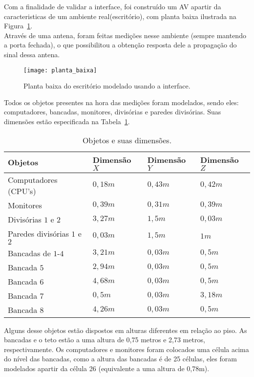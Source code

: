 Com a finalidade de validar a interface, foi construído um AV apartir da caracteristicas de um ambiente real(escritório), com planta baixa ilustrada na Figura~\ref{fg:planta_baixa}.\\

 Através de uma antena, foram feitas medições nesse ambiente (sempre mantendo a porta fechada), o que possibilitou a obtenção resposta dele a propagação do sinal dessa antena.\\

\begin{figure}[!htp]
	\centering
	\texttt{[image: planta\_baixa]}
	\caption{Planta baixa do escritório modelado usando a interface.}
	\label{fg:planta_baixa}
\end{figure}

Todos os objetos presentes na hora das medições foram modelados, sendo eles: computadores, bancadas, monitores, divisórias e paredes divisórias. Suas dimensões estão especificada na Tabela~\ref{tb:objetos}.

\begin{table}
\centering
	\begin{tabular}{|l|l|l|l|}
	\hline
	\textbf{Objetos} & \textbf{Dimensão $X$} & \textbf{Dimensão} $Y$ & \textbf{Dimensão $Z$}\\ \hline
	Computadores (CPU's) & $0,18m$ & $0,43m$ & $0,42m$ \\ \hline
	Monitores & $0,39m$ & $0,31m$ & $0,39m$ \\ \hline
	Divisórias $1$ e $2$ & $3,27m$ & $1,5m$ & $0,03m$ \\ \hline
	Paredes divisórias $1$ e $2$ & $0,03m$ & $1,5m$ & $1m$ \\ \hline
	Bancadas de $1$-$4$ & $3,21m$ & $0,03m$ & $0,5m$ \\ \hline
	Bancada $5$ & $2,94m$ & $0,03m$ & $0,5m$ \\ \hline
	Bancada $6$ & $4,68m$ & $0,03m$ & $0,5m$ \\ \hline
	Bancada $7$ & $0,5m$ & $0,03m$ & $3,18m$ \\ \hline
	Bancada $8$ & $4,26m$ & $0,03m$ & $0,5m$ \\
	\hline
	\end{tabular}
	\caption{Objetos e suas dimensões.}
	\label{tb:objetos}
\end{table}

Alguns desse objetos estão dispostos em alturas diferentes em relação ao piso. As bancadas e o teto estão a uma altura de 0,75 metros e 2,73 metros, respectivamente. Os computadores e monitores foram colocados uma célula acima do nível das bancadas, como a altura das bancadas é de 25 células, eles foram modelados apartir da célula 26 (equivalente a uma altura de 0,78m).\\

